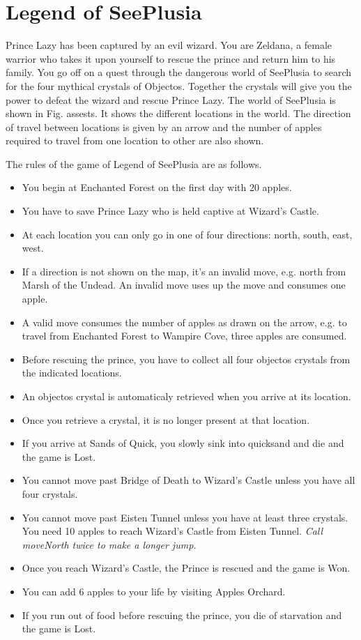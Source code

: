 \documentclass[a4paper,12pt]{article}
\begin{document}
	\newpage
	
	\section{Legend of SeePlusia}

	Prince Lazy has been captured by an evil wizard. You are Zeldana, a female warrior who takes it upon
	yourself to rescue the prince and return him to his family. You go off on a quest through the dangerous
	world of SeePlusia to search for the four mythical crystals of Objectos. Together the crystals will give
	you the power to defeat the wizard and rescue Prince Lazy.
	The world of SeePlusia is shown in Fig. assests. It shows the different locations in the world. The direction of travel between locations is given by an arrow and the number of apples required to travel from one location to other are also shown.
	
	The rules of the game of Legend of SeePlusia are as follows.
\begin{itemize}
	\item You begin at Enchanted Forest on the first day with 20 apples.
	\item You have to save Prince Lazy who is held captive at Wizard's Castle.
	\item At each location you can only go in one of four directions: north, south, east, west.
	\item If a direction is not shown on the map, it's an invalid move, e.g. north from
	Marsh of the Undead. An invalid move uses up the move and consumes one apple.
	\item A valid move consumes the number of apples as drawn on the arrow, e.g. to travel from Enchanted Forest to Wampire Cove, three apples are consumed.
	\item Before rescuing the prince, you have to collect all four objectos crystals from the indicated locations.
	\item An objectos crystal is automaticaly retrieved when you arrive at its location.
	\item Once you retrieve a crystal, it is no longer present at that location.
	\item If you arrive at Sands of Quick, you slowly sink into quicksand and die and the game is Lost.
	\item You cannot move past Bridge of Death to Wizard's Castle unless you have all four crystals.
	\item You cannot move past Eisten Tunnel unless you have at least three crystals. You need 10 apples to reach Wizard's Castle from Eisten Tunnel. \textit{Call moveNorth twice to make a longer jump.}
	\item Once you reach Wizard’s Castle, the Prince is rescued and the game is Won.
	\item You can add 6 apples to your life by visiting Apples Orchard.
	\item If you run out of food before rescuing the prince, you die of starvation and the game is Lost.
\end{itemize}
	
\end{document}
